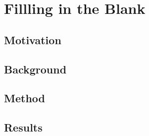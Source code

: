 \chapter{Fillling in the Blank} \label{chap:fitb}

\section{Motivation}
\section{Background}
\section{Method}
\section{Results}